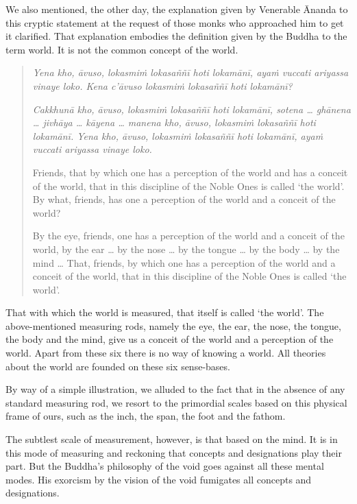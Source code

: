 We also mentioned, the other day, the explanation given by Venerable Ānanda to this cryptic statement at the request of those monks who approached him to get it clarified. That explanation embodies the definition given by the Buddha to the term world. It is not the common concept of the world.

\begin{quote}
\emph{Yena kho, āvuso, lokasmiṁ lokasaññī hoti lokamānī, ayaṁ vuccati ariyassa vinaye loko. Kena c'āvuso lokasmiṁ lokasaññī hoti lokamānī?}

\emph{Cakkhunā kho, āvuso, lokasmiṁ lokasaññī hoti lokamānī, sotena \ldots{} ghānena \ldots{} jivhāya \ldots{} kāyena \ldots{} manena kho, āvuso, lokasmiṁ lokasaññī hoti lokamānī. Yena kho, āvuso, lokasmiṁ lokasaññī hoti lokamānī, ayaṁ vuccati ariyassa vinaye loko.}

Friends, that by which one has a perception of the world and has a conceit of the world, that in this discipline of the Noble Ones is called `the world'. By what, friends, has one a perception of the world and a conceit of the world?

By the eye, friends, one has a perception of the world and a conceit of the world, by the ear \ldots{} by the nose \ldots{} by the tongue \ldots{} by the body \ldots{} by the mind \ldots{} That, friends, by which one has a perception of the world and a conceit of the world, that in this discipline of the Noble Ones is called `the world'.
\end{quote}

That with which the world is measured, that itself is called `the world'. The above-mentioned measuring rods, namely the eye, the ear, the nose, the tongue, the body and the mind, give us a conceit of the world and a perception of the world. Apart from these six there is no way of knowing a world. All theories about the world are founded on these six sense-bases.

By way of a simple illustration, we alluded to the fact that in the absence of any standard measuring rod, we resort to the primordial scales based on this physical frame of ours, such as the inch, the span, the foot and the fathom.

The subtlest scale of measurement, however, is that based on the mind. It is in this mode of measuring and reckoning that concepts and designations play their part. But the Buddha's philosophy of the void goes against all these mental modes. His exorcism by the vision of the void fumigates all concepts and designations.

